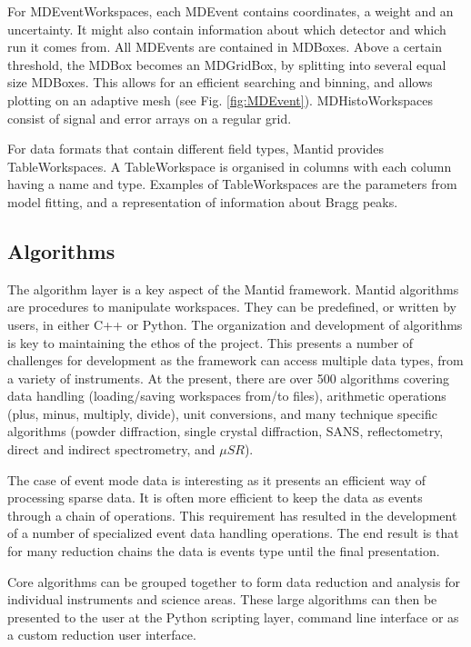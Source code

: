 \documentclass[1p]{elsarticle}
\begin{document}
For MDEventWorkspaces, each MDEvent contains coordinates, a weight and an uncertainty. It might also contain information about which detector and which run it comes from. All MDEvents are contained in MDBoxes. Above a certain threshold, the MDBox becomes an MDGridBox, by splitting into several equal size MDBoxes. This allows for an efficient searching and binning, and allows plotting on an adaptive mesh (see Fig. \ref{fig:MDEvent}).
MDHistoWorkspaces consist of signal and error arrays on a regular grid.  


For data formats that contain different field types, Mantid provides TableWorkspaces. A TableWorkspace is organised in columns with each column having a name and type. Examples of TableWorkspaces are the parameters from model fitting, and a representation of information about Bragg peaks.


\subsection{Algorithms}
The algorithm layer is a key aspect of the Mantid framework.
Mantid algorithms are procedures to manipulate workspaces. They can be predefined, or written by users, in either C++ or Python.  The organization and development of algorithms is key to maintaining the ethos of the project. This presents a number of challenges for development as the framework can access multiple data types, from a variety of instruments. At the present, there are over 500 algorithms covering data handling (loading/saving workspaces from/to files), arithmetic operations (plus, minus, multiply, divide), unit conversions, and many technique specific algorithms (powder diffraction, single crystal diffraction, SANS, reflectometry, direct and indirect spectrometry, and $\mu SR$).  

The case of event mode data is interesting as it presents an efficient way of processing sparse data. It is often more efficient to keep the data as events through a chain of operations. This requirement has resulted in the development of a number of specialized event data handling operations. The end result is that for many reduction chains the data is events type until the final presentation. 

Core algorithms can be grouped together to form data reduction and analysis for individual instruments and science areas. These large algorithms can then be presented to the user at the Python scripting layer, command line interface or as a custom reduction user interface. 
\end{document}
